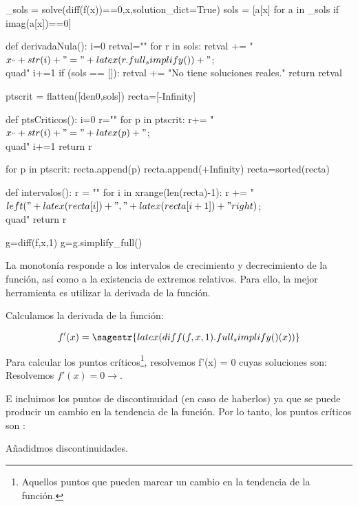 \begin{sagesilent}

_sols = solve(diff(f(x))==0,x,solution_dict=True)
sols = [a[x] for a in _sols if imag(a[x])==0]

def derivadaNula():
    i=0
    retval=""
    for r in sols:
        retval += "$x_"+str(i)+" = "+latex(r.full_simplify())+"$;\\quad"
        i+=1
    if (sols == []):
        retval += "No tiene soluciones reales."
    return retval

ptscrit = flatten([den0,sols])
recta=[-Infinity]

def ptsCriticos():
    i=0
    r=""
    for p in ptscrit:
        r+= "$x_"+str(i)+"="+latex(p)+"$;\\quad"
        i+=1
    return r

for p in ptscrit:
     recta.append(p)
recta.append(+Infinity)
recta=sorted(recta)

def intervalos():
    r = ""
    for i in xrange(len(recta)-1):
        r += "$\\left("+latex(recta[i])+","+latex(recta[i+1])+"\\right)$;\\quad"  
    return r

g=diff(f,x,1)
g=g.simplify_full()
\end{sagesilent}

\ifverbose
La monotonía responde a los intervalos de crecimiento y decrecimiento de la función, así como a la existencia de extremos relativos.
%
Para ello, la mejor herramienta es utilizar la derivada de la función.

Calculamos la derivada de la función:
\fi

\[f'(x) = \sagestr{latex(diff(f,x,1).full_simplify()(x))} \]%

\ifverbose
    Para calcular los puntos críticos\footnote{Aquellos puntos que pueden marcar un cambio en la tendencia de la función.}, resolvemos f'(x) = 0 cuyas soluciones son:
    \\

\else
    Resolvemos $f'(x) = 0\rightarrow $. 
\fi
{}

\ifverbose
E incluimos los puntos de discontinuidad (en caso de haberlos) ya que se puede producir un cambio en la tendencia de la función. 
%
Por lo tanto, los puntos críticos son : 

\else
Añadidmos discontinuidades. 

